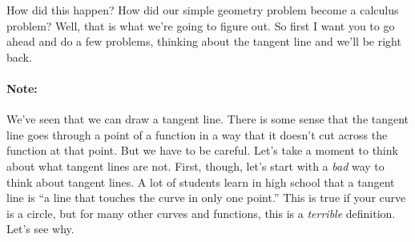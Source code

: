 \documentclass[pdftex, brazil, 12pt, twoside]{article}
\begin{document}
\begin{figure}[H]
  \begin{center}
  \end{center}
\end{figure}

How did this happen?
How did our simple geometry problem
become a calculus problem?
Well, that is what we're going to figure out.
So first I want you to go ahead and do a few problems,
thinking about the tangent line and we'll be right back.

\paragraph{Note:} We've seen that we can draw a tangent line. There is some sense
that the tangent line goes through a point of a function in a way that it doesn't
cut across the function at that point. But we have to be careful. Let's take a
moment to think about what tangent lines are not. First, though, let's start with
a \emph{bad} way to think about tangent lines. A lot of students learn in high
school that a tangent line is ``a line that touches the curve in only one point.''
This is true if your curve is a circle, but for many other curves and functions,
this is a \emph{terrible} definition. Let's see why.
\end{document}
